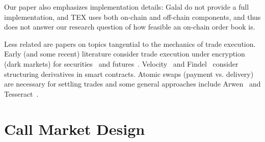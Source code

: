 Our paper also emphasizes implementation details: Galal \etal do not provide a full implementation, and TEX uses both on-chain and off-chain components, and thus does not answer our research question of how feasible an on-chain order book is.

Less related are papers on topics tangential to the mechanics of trade execution. Early (and some recent) literature consider trade execution under encryption (\ie dark markets) for securities~\cite{TP07,YSLT10,TW12,cartlidge2019mpc} and futures~\cite{massacci2018futuresmex}. Velocity~\cite{eskandari2017feasibility} and Findel~\cite{biryukov2017findel} consider structuring derivatives in smart contracts. Atomic swaps (\ie payment vs. delivery) are necessary for settling trades and some general approaches include Arwen~\cite{heilman2020arwen} and Tesseract~\cite{bentov2017tesseract}.





\section{Call Market Design}



